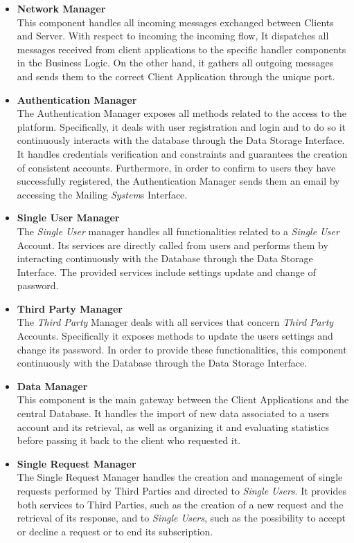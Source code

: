 \documentclass[titlepage]{article}
\begin{document}
	\begin{itemize}
		\item {\bf Network Manager }\\
		This component handles all incoming messages exchanged between Clients and Server. With respect to incoming the incoming flow, It dispatches all messages received from client applications to the specific handler components in the Business Logic. On the other hand, it gathers all outgoing messages and sends them to the correct Client Application through the unique port.
		\item {\bf Authentication Manager }\\
		The Authentication Manager exposes all methods related to the access to the platform. Specifically, it deals with user registration and login and to do so it continuously interacts with the database through the Data Storage Interface. It handles credentials verification and constraints and guarantees the creation of consistent accounts. Furthermore, in order to confirm to users they have successfully registered, the Authentication Manager sends them an email by accessing the Mailing {\it System}\textsc{}s Interface.
		\item {\bf Single User Manager }\\
		The {\it Single User} manager handles all functionalities related to a {\it Single User} Account. Its services are directly called from users and performs them by interacting continuously with the Database through the Data Storage Interface. The provided services include settings update and change of password.
		\item {\bf Third Party Manager }\\
		The {\it Third Party} Manager deals with all services that concern {\it Third Party} Accounts. Specifically it exposes methods to update the user\textsc{}s settings and change its password. In order to provide these functionalities, this component continuously with the Database through the Data Storage Interface.
		\item {\bf Data Manager }\\
		This component is the main gateway between the Client Applications and the central Database. It handles the import of new data associated to a user\textsc{}s account and its retrieval, as well as organizing it and evaluating statistics before passing it back to the client who requested it.
		\item {\bf Single Request Manager }\\
		The Single Request Manager handles the creation and management of single requests performed by Third Parties and directed to {\it Single Users}. It provides both services to Third Parties, such as the creation of a new request and the retrieval of its response, and to {\it Single Users}, such as the possibility to accept or decline a request or to end its subscription. \newline

\end{itemize}
\end{document}
